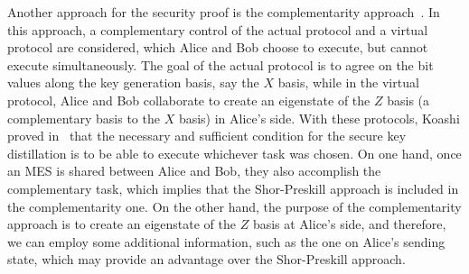 \documentclass[prl,twocolumn,superscriptaddress,nofootinbib]{revtex4}
\begin{document}
Another approach for the security proof is the complementarity approach~\cite{Koashi2007}. 
In this approach, a complementary control of the actual protocol and a virtual protocol are considered, 
which Alice and Bob choose to execute, but cannot execute simultaneously.
The goal of the actual protocol is to agree on the bit values along the key generation basis, say the $X$ basis, while 
in the virtual protocol, Alice and Bob collaborate to create an eigenstate of the $Z$ basis (a complementary basis to the
$X$ basis) in Alice's side.
With these protocols, Koashi proved in~\cite{Koashi2007} that the necessary and
sufficient condition for the secure key distillation is to be able to execute whichever task was chosen. 
On one hand, once an MES is shared between Alice and Bob, they also accomplish the complementary task, which implies that 
the Shor-Preskill approach is included in the complementarity one.
On the other hand, the purpose of the complementarity approach is to create an eigenstate of the $Z$ basis at Alice's side, and 
therefore, we can employ some additional information, such as the one on Alice's sending state,
which may provide an advantage over the Shor-Preskill approach.
\end{document}
